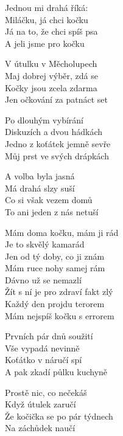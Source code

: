 
\vspace{-5px}
\ve
{}Jednou mi drahá říká:\\
Miláčku, já chci kočku\\
Já na to, že chci spíš psa\\
A jeli jsme pro kočku

\vspace{-5px}
\ve
V útulku v Měcholupech\\
Maj dobrej výběr, zdá se\\
Kočky jsou zcela zdarma\\
Jen očkování za patnáct set

\vspace{-5px}
\ve
Po dlouhým vybírání\\
Diskuzích a dvou hádkách\\
Jedno z koťátek jemně sevře\\
Můj prst ve svých drápkách

\vspace{-5px}
\ve
A volba byla jasná\\
Má drahá slzy suší\\
Co si však vezem domů\\
To ani jeden z nás netuší

\vspace{-5px}
\cho{}
Mám doma kočku, mám ji rád\\
Je to skvělý kamarád\\
Jen od tý doby, co ji znám\\
Mám ruce nohy samej rám\\
Dávno už se nemazlí\\
Žít s ní je pro zdraví fakt zlý\\
Každý den projdu terorem\\
Mám nejspíš kočku s errorem

\vspace{-5px}
\ve
Prvních pár dnů soužití\\
Vše vypadá nevinně\\
Koťátko v náručí spí\\
A pak zkadí půlku kuchyně

\vspace{-5px}
\ve
Prostě nic, co nečekáš\\
Když útulek zaručí\\
Že kočička se po pár týdnech\\
Na záchůdek naučí

